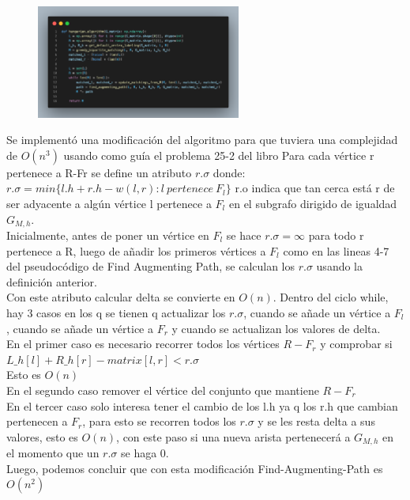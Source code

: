 \documentclass[sn-mathphys,Numbered]{sn-jnl}%
\theoremstyle{thmstyleone}%
\theoremstyle{thmstyletwo}%
\theoremstyle{thmstylethree}%
\begin{document}
     \begin{figure}[htb]
        \centering
        \includegraphics[width=0.6\textwidth]{3.png}
        \centering
    \end{figure}


 Se implement\'o una modificaci\'on del algoritmo para que tuviera una complejidad de $O(n^3)$ usando como gu\'ia el problema 25-2 del libro
Para cada v\'ertice r pertenece a R-Fr se define un atributo $r.\sigma$ donde:
$r.\sigma = min\{l.h + r.h - w(l,r): l~pertenece ~F_l\}$
r.o indica que tan cerca est\'a r de ser adyacente a alg\'un v\'ertice l pertenece a $F_l$ en el subgrafo dirigido de igualdad $G_{M,h} $.
\\
Inicialmente, antes de poner un v\'ertice en $F_l$ se hace $r.\sigma = \infty $ para todo r pertenece a R, luego de añadir los primeros v\'ertices a $F_l$ como en las lineas 4-7 del pseudocódigo de Find Augmenting Path, se calculan los $r.\sigma$ usando la definición anterior.\\
Con este atributo calcular delta se convierte en $O(n)$.
Dentro del ciclo while, hay 3 casos en los q se tienen q actualizar los $r.\sigma$, cuando se añade un vértice a $F_l$, cuando se añade un vértice a $F_r$ y cuando se actualizan los valores de delta.\\
En el primer caso es necesario recorrer todos los v\'ertices $R-F_r$ y comprobar si
$L\_h[l] + R\_h[r] - matrix[l,r] < r.\sigma$ \\
Esto es $O(n)$\\
En el segundo caso remover el vértice del conjunto que mantiene $R-F_r$\\
En el tercer caso solo interesa tener el cambio de los l.h ya q los r.h que cambian pertenecen a $F_r$, para esto se recorren todos los $r.\sigma$ y se les resta delta a sus valores, esto es $O(n)$, con este paso si una nueva arista pertenecerá a $G_{M,h}$ en el momento que un $r.\sigma$ se haga 0.\\

Luego, podemos concluir que con esta modificaci\'on Find-Augmenting-Path es $O(n^2)$ \\
\end{document}
